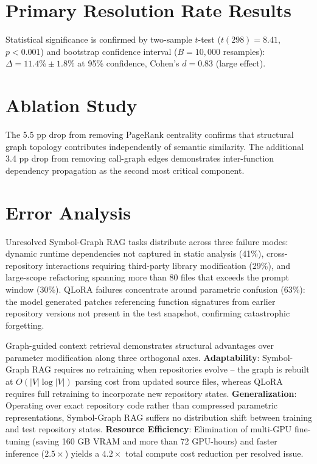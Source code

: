 \documentclass[10pt,twocolumn,letterpaper]{article}
\begin{document}
\section{Primary Resolution Rate Results}










Statistical significance is confirmed by two-sample $t$-test ($t(298) = 8.41$, $p < 0.001$) and bootstrap confidence interval ($B = 10{,}000$ resamples): $\Delta = 11.4\% \pm 1.8\%$ at 95\% confidence, Cohen's $d = 0.83$ (large effect). \cite{crossref_10_1201_9788743808145_14}


\section{Ablation Study}








The 5.5 pp drop from removing PageRank centrality confirms that structural graph topology contributes independently of semantic similarity. The additional 3.4 pp drop from removing call-graph edges demonstrates inter-function dependency propagation as the second most critical component.


\section{Error Analysis}


Unresolved Symbol-Graph RAG tasks distribute across three failure modes: dynamic runtime dependencies not captured in static analysis (41\%), cross-repository interactions requiring third-party library modification (29\%), and large-scope refactoring spanning more than 80 files that exceeds the prompt window (30\%). QLoRA failures concentrate around parametric confusion (63\%): the model generated patches referencing function signatures from earlier repository versions not present in the test snapshot, confirming catastrophic forgetting. \cite{crossref_10_1201_9788743808145_14}



Graph-guided context retrieval demonstrates structural advantages over parameter modification along three orthogonal axes. \textbf{Adaptability}: Symbol-Graph RAG requires no retraining when repositories evolve -- the graph is rebuilt at $O(|V| \log |V|)$ parsing cost from updated source files, whereas QLoRA requires full retraining to incorporate new repository states. \textbf{Generalization}: Operating over exact repository code rather than compressed parametric representations, Symbol-Graph RAG suffers no distribution shift between training and test repository states. \textbf{Resource Efficiency}: Elimination of multi-GPU fine-tuning (saving 160 GB VRAM and more than 72 GPU-hours) and faster inference ($2.5\times$) yields a $4.2\times$ total compute cost reduction per resolved issue.
\end{document}
